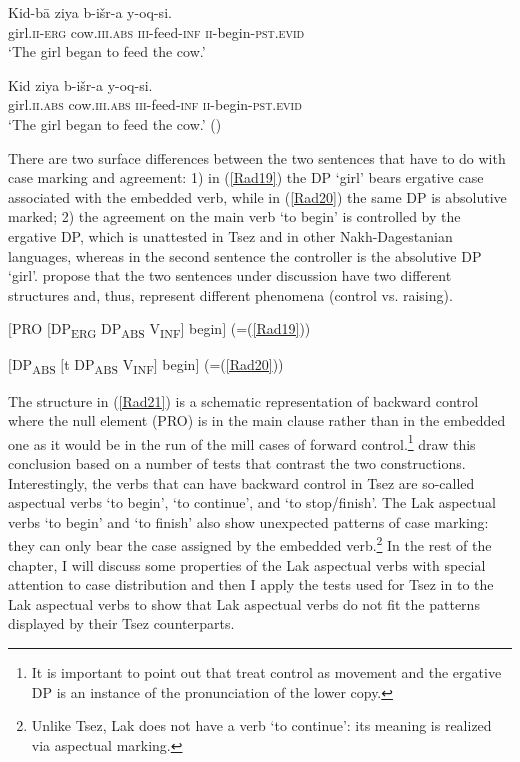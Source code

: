 \documentclass[output=paper]{langscibook}
\begin{document}
\ea\label{Rad19}
\gll Kid-bā 	ziya b-išr-a y-oq-si.\\
girl.\textsc{ii-erg} cow.\textsc{iii.abs} \textsc{iii}-feed-\textsc{inf} \textsc{ii}-begin-\textsc{pst.evid}\\
\glt ‘The girl began to feed the cow.’
\z

\ea\label{Rad20}
\gll Kid 	ziya b-išr-a y-oq-si.\\
girl.\textsc{ii.abs} cow.\textsc{iii.abs} \textsc{iii}-feed-\textsc{inf} \textsc{ii}-begin-\textsc{pst.evid}\\
\glt ‘The girl began to feed the cow.’ (\citealt[248-249]{PolinskyPotsdam2002})
\z

There are two surface differences between the two sentences that have to do with case marking and agreement: 1) in (\ref{Rad19}) the DP ‘girl’ bears ergative case associated with the embedded verb, while in (\ref{Rad20}) the same DP is absolutive marked; 2) the agreement on the main verb ‘to begin’  is controlled by the ergative DP, which is unattested in Tsez and in other Nakh-Dagestanian languages, whereas in the second sentence the controller is the absolutive DP ‘girl’. \citet{PolinskyPotsdam2002} propose that the two sentences under discussion have two different structures and, thus, represent different phenomena (control vs. raising). 

\ea\label{Rad21}
$[$PRO $[$DP\textsubscript{ERG} DP\textsubscript{ABS} V\textsubscript{INF}$]$ begin$]$ (=(\ref{Rad19}))
\z

\ea\label{Rad22}
$[$DP\textsubscript{ABS} $[$t DP\textsubscript{ABS} V\textsubscript{INF}$]$ begin$]$ (=(\ref{Rad20}))
\z

The structure in (\ref{Rad21}) is a schematic representation of backward control where the null element (PRO) is in the main clause rather than in the embedded one as it would be in the run of the mill cases of forward control.\footnote{It is important to point out that \citet{PolinskyPotsdam2002} treat control as movement \citep{hornstein1999} and the ergative DP is an instance of the pronunciation of the lower copy.} \citet{PolinskyPotsdam2002} draw this conclusion based on a number of tests that contrast the two constructions. Interestingly, the verbs that can have backward control in Tsez are so-called aspectual verbs ‘to begin’, ‘to continue’, and ‘to stop/finish’. The Lak aspectual verbs ‘to begin’ and ‘to finish’ also show unexpected patterns of case marking: they can only bear the case assigned by the embedded verb.\footnote{Unlike Tsez, Lak does not have a verb ‘to continue’: its meaning is realized via aspectual marking.} In the rest of the chapter, I will discuss some properties of the Lak aspectual verbs with special attention to case distribution and then I apply the tests used for Tsez in \citet{PolinskyPotsdam2002} to the Lak aspectual verbs to show that Lak aspectual verbs do not fit the patterns displayed by their Tsez counterparts.\\
\end{document}
